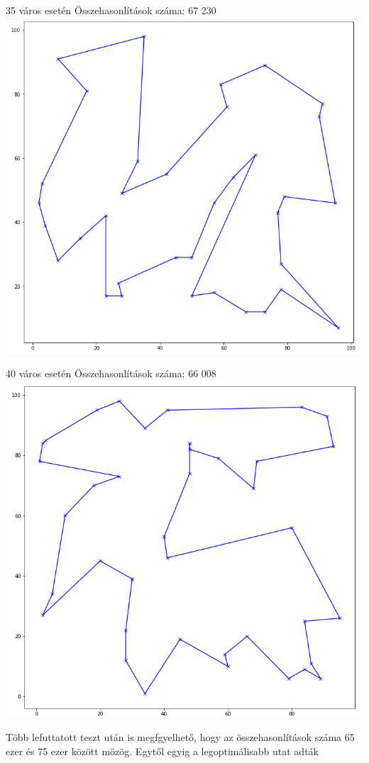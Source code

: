 \documentclass[12pt,a4paper]{article}
\begin{document}
35 város esetén
Összehasonlítások száma: 67 230
\includegraphics[scale=0.4]{35.png}

40 város esetén
Összehasonlítások száma: 66 008
\includegraphics[scale=0.4]{40.png}

Több lefuttatott teszt után is megfgyelhető, hogy az összehasonlítások száma 65 ezer és 75 ezer között mözög. Egytől egyig a legoptimálisabb utat adták
\end{document}
